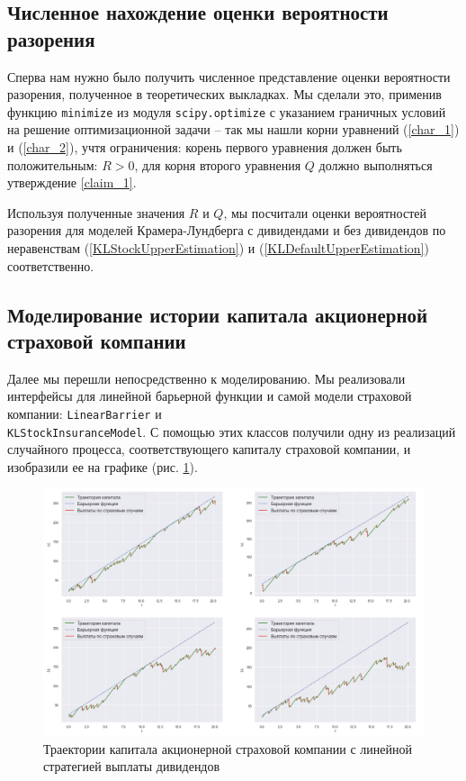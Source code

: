\documentclass{article}
\theoremstyle{plain}
\theoremstyle{plain}
\theoremstyle{plain}
\theoremstyle{plain}
\theoremstyle{definition}
\theoremstyle{remark}
\begin{document}
\subsection{Численное нахождение оценки вероятности разорения}

Сперва нам нужно было получить численное представление оценки вероятности разорения, полученное в теоретических выкладках. Мы сделали это, применив функцию \texttt{minimize} из модуля \texttt{scipy.optimize} с указанием граничных условий на решение оптимизационной задачи -- так мы нашли корни уравнений (\ref{char_1}) и (\ref{char_2}), учтя ограничения: корень первого уравнения должен быть положительным: $R > 0$, для корня второго уравнения $Q$ должно выполняться утверждение \ref{claim_1}.

Используя полученные значения $R$ и $Q$, мы посчитали оценки вероятностей разорения для моделей Крамера-Лундберга с дивидендами и без дивидендов по неравенствам (\ref{KLStockUpperEstimation}) и (\ref{KLDefaultUpperEstimation}) соответственно.

\subsection{Моделирование истории капитала акционерной страховой компании}

Далее мы перешли непосредственно к моделированию. Мы реализовали интерфейсы для линейной барьерной функции и самой модели страховой компании: \texttt{LinearBarrier} и \\
\texttt{KLStockInsuranceModel}. С помощью этих классов получили одну из реализаций случайного процесса, соответствующего капиталу страховой компании, и изобразили ее на графике (рис. \ref{stock_trajectory}).

\begin{figure}[h]
\centering
\includegraphics[scale=0.5]{images/KL_stock_trajectory.png}
\captionsetup{justification=centering}
\caption{Траектории капитала акционерной страховой компании с линейной стратегией выплаты дивидендов}
\label{stock_trajectory}
\end{figure}
\end{document}
